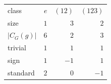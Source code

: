 \begin{tabular}{lrrr}
\toprule
class & $e$ & $(12)$ & $(123)$ \\
size & $1$ & $3$ & $2$ \\
$|C_G(g)|$ & $6$ & $2$ & $3$ \\
\midrule
trivial & $1$ & $1$ & $1$ \\
sign & $1$ & $-1$ & $1$ \\
standard & $2$ & $0$ & $-1$ \\
\bottomrule
\end{tabular}
